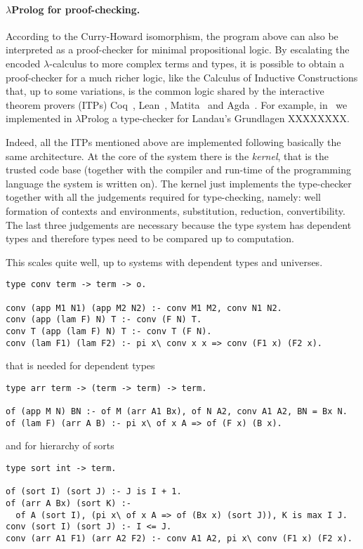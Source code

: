 \documentclass{easychair}
\begin{document}
\paragraph{$\lambda$Prolog for proof-checking.}

According to the Curry-Howard isomorphism, the program above can also
be interpreted as a proof-checker for minimal propositional logic. By
escalating the encoded $\lambda$-calculus to more complex terms and
types, it is possible to obtain a proof-checker for a much richer
logic, like the Calculus of Inductive Constructions that, up to some
variations, is the common logic shared by the interactive theorem
provers (ITPs) Coq~\cite{}, Lean~\cite{}, Matita~\cite{} and
Agda~\cite{}. For example, in~\cite{us} we implemented in
$\lambda$Prolog a type-checker for Landau's Grundlagen XXXXXXXX.

Indeed, all the ITPs mentioned above are implemented following
basically the same architecture. At the core of the system there is
the \emph{kernel}, that is the trusted code base (together with the
compiler and run-time of the programming language the system is
written on). The kernel just implements the type-checker together with
all the judgements required for type-checking, namely: well formation
of contexts and environments, substitution, reduction, convertibility.
The last three judgements are necessary because the type system has
dependent types and therefore types need to be compared up to
computation.

This scales quite well, up to systems with dependent types and
universes.

\begin{verbatim}
type conv term -> term -> o.

conv (app M1 N1) (app M2 N2) :- conv M1 M2, conv N1 N2.
conv (app (lam F) N) T :- conv (F N) T.
conv T (app (lam F) N) T :- conv T (F N).
conv (lam F1) (lam F2) :- pi x\ conv x x => conv (F1 x) (F2 x).
\end{verbatim}

that is needed for dependent types

\begin{verbatim}
type arr term -> (term -> term) -> term.

of (app M N) BN :- of M (arr A1 Bx), of N A2, conv A1 A2, BN = Bx N.
of (lam F) (arr A B) :- pi x\ of x A => of (F x) (B x).
\end{verbatim}

and for hierarchy of sorts

\begin{verbatim}
type sort int -> term.

of (sort I) (sort J) :- J is I + 1.
of (arr A Bx) (sort K) :-
  of A (sort I), (pi x\ of x A => of (Bx x) (sort J)), K is max I J.
conv (sort I) (sort J) :- I <= J.
conv (arr A1 F1) (arr A2 F2) :- conv A1 A2, pi x\ conv (F1 x) (F2 x).
\end{verbatim}
\end{document}
